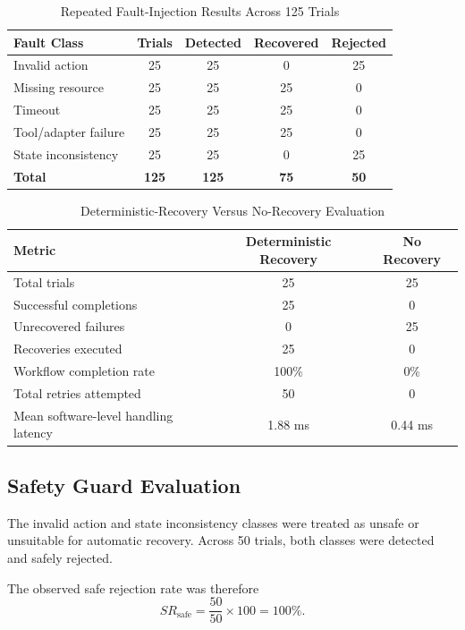 \documentclass[conference]{IEEEtran}
\begin{document}
\begin{table}[htbp]
\caption{Repeated Fault-Injection Results Across 125 Trials}
\label{tab:fault_injection_125}
\centering
\begin{tabular}{l c c c c}
\toprule
\textbf{Fault Class} & \textbf{Trials} & \textbf{Detected} & \textbf{Recovered} & \textbf{Rejected} \\
\midrule
Invalid action & 25 & 25 & 0 & 25 \\
Missing resource & 25 & 25 & 25 & 0 \\
Timeout & 25 & 25 & 25 & 0 \\
Tool/adapter failure & 25 & 25 & 25 & 0 \\
State inconsistency & 25 & 25 & 0 & 25 \\
\midrule
\textbf{Total} & \textbf{125} & \textbf{125} & \textbf{75} & \textbf{50} \\
\bottomrule
\end{tabular}
\end{table}

\begin{table}[htbp]
\caption{Deterministic-Recovery Versus No-Recovery Evaluation}
\label{tab:recovery_vs_norecovery}
\centering
\begin{tabular}{p{3.8cm} c c}
\toprule
\textbf{Metric} & \textbf{Deterministic Recovery} & \textbf{No Recovery} \\
\midrule
Total trials & 25 & 25 \\
Successful completions & 25 & 0 \\
Unrecovered failures & 0 & 25 \\
Recoveries executed & 25 & 0 \\
Workflow completion rate & 100\% & 0\% \\
Total retries attempted & 50 & 0 \\
Mean software-level handling latency & 1.88 ms & 0.44 ms \\
\bottomrule
\end{tabular}
\end{table}

\subsection{Safety Guard Evaluation}
The invalid action and state inconsistency classes were treated as unsafe or unsuitable for automatic recovery. Across 50 trials, both classes were detected and safely rejected.

The observed safe rejection rate was therefore
\begin{equation}
SR_{\text{safe}} = \frac{50}{50} \times 100 = 100\%.
\end{equation}
\end{document}
